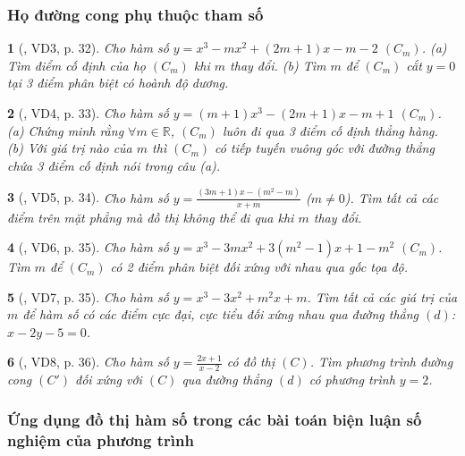 \documentclass{article}
\newtheorem{baitoan}{}
\begin{document}
\subsubsection{Họ đường cong phụ thuộc tham số}

\begin{baitoan}[\cite{TLCT_giai_tich_12}, VD3, p. 32]
	Cho hàm số $y = x^3 - mx^2 + (2m + 1)x - m - 2$ $(C_m)$. (a) Tìm điểm cố định của họ $(C_m)$ khi $m$ thay đổi. (b) Tìm $m$ để $(C_m)$ cắt $y = 0$ tại 3 điểm phân biệt có hoành độ dương.	
\end{baitoan}

\begin{baitoan}[\cite{TLCT_giai_tich_12}, VD4, p. 33]
	Cho hàm số $y = (m + 1)x^3 - (2m + 1)x - m + 1$ $(C_m)$. (a) Chứng minh rằng $\forall m\in\mathbb{R}$, $(C_m)$ luôn đi qua 3 điểm cố định thẳng hàng. (b) Với giá trị nào của $m$ thì $(C_m)$ có tiếp tuyến vuông góc với đường thẳng chứa 3 điểm cố định nói trong câu (a).	
\end{baitoan}

\begin{baitoan}[\cite{TLCT_giai_tich_12}, VD5, p. 34]
	Cho hàm số $y = \frac{(3m + 1)x - (m^2 - m)}{x + m}$ ($m\ne 0$). Tìm tất cả các điểm trên mặt phẳng mà đồ thị không thể đi qua khi $m$ thay đổi.
\end{baitoan}

\begin{baitoan}[\cite{TLCT_giai_tich_12}, VD6, p. 35]
	Cho hàm số $y = x^3 - 3mx^2 + 3(m^2 - 1)x + 1 - m^2$ $(C_m)$. Tìm $m$ để $(C_m)$ có 2 điểm phân biệt đối xứng với nhau qua gốc tọa độ.
\end{baitoan}

\begin{baitoan}[\cite{TLCT_giai_tich_12}, VD7, p. 35]
	Cho hàm số $y = x^3 - 3x^2 + m^2x + m$. Tìm tất cả các giá trị của $m$ để hàm số có các điểm cực đại, cực tiểu đối xứng nhau qua đường thẳng $(d)$: $x - 2y - 5 = 0$.
\end{baitoan}

\begin{baitoan}[\cite{TLCT_giai_tich_12}, VD8, p. 36]
	Cho hàm số $y = \frac{2x + 1}{x - 2}$ có đồ thị $(C)$. Tìm phương trình đường cong $(C')$ đối xứng với $(C)$ qua đường thẳng $(d)$ có phương trình $y = 2$. 
\end{baitoan}

\subsubsection{Ứng dụng đồ thị hàm số trong các bài toán biện luận số nghiệm của phương trình}
\end{document}
